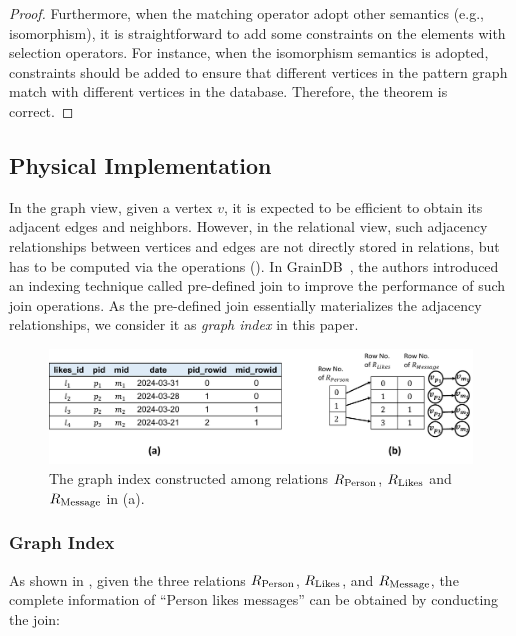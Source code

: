 \begin{proof}
    Furthermore, when the matching operator adopt other semantics (e.g., isomorphism), it is straightforward to add some constraints on the elements with selection operators.
    For instance, when the isomorphism semantics is adopted, constraints should be added to ensure that different vertices in the pattern graph match with different vertices in the database.
    Therefore, the theorem is correct.
\end{proof}
\fi


\subsection{Physical Implementation}
\label{sec:physical-operators}

In the graph view, given a vertex $v$, it is expected to be efficient to obtain its adjacent edges and neighbors. However, in the relational view, such adjacency relationships between vertices and edges are not directly stored in relations, but has to be computed via the \EVjoin operations (). In GrainDB~\cite{graindb}, the authors introduced an indexing technique called pre-defined join to improve the performance of such join operations. As the pre-defined join essentially materializes the adjacency relationships, we consider it as \emph{graph index} in this paper.

\begin{figure}
    \centering
    \includegraphics[width=.8\linewidth]{./figures/graph-index-likes.pdf}
    \caption{The graph index constructed among relations ${R_{\text{Person}}}$, ${R_{\text{Likes}}}$
    and ${R_{\text{Message}}}$ in (a).}
    \label{fig:graph-index}
\end{figure}

\subsubsection{Graph Index}
\label{sec:graph-index}

As shown in , given the three relations ${R_{\text{Person}}}$, ${R_{\text{Likes}}}$, and ${R_{\text{Message}}}$, the complete information of ``Person likes messages'' can be obtained by conducting the join:

